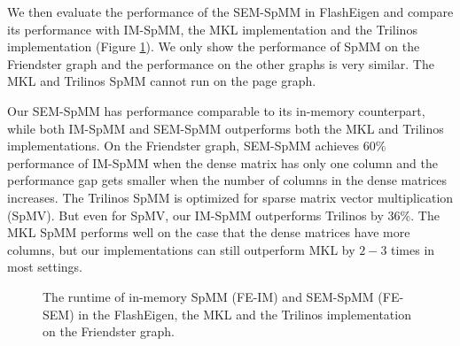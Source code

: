 We then evaluate the performance of the SEM-SpMM in FlashEigen and compare its
performance with IM-SpMM, the MKL implementation and the Trilinos
implementation (Figure \ref{perf:spmm}). We only show the performance of
SpMM on the Friendster graph and the performance on the other graphs is very
similar. The MKL and Trilinos SpMM cannot run on the page graph.

Our SEM-SpMM has performance comparable to its in-memory counterpart, while
both IM-SpMM and SEM-SpMM outperforms both the MKL and Trilinos
implementations. On the Friendster graph, SEM-SpMM achieves 60\% performance
of IM-SpMM when the dense matrix has only one column and the performance gap
gets smaller when the number of columns in the dense matrices increases.
The Trilinos SpMM is optimized for sparse matrix vector multiplication (SpMV).
But even for SpMV, our IM-SpMM outperforms Trilinos by 36\%. The MKL SpMM
performs well on the case that the dense matrices have more columns, but our
implementations can still outperform MKL by $2-3$ times in most settings.

\begin{figure}
	\begin{center}
		\footnotesize
		\vspace{-15pt}
		
		\vspace{-15pt}
		\caption{The runtime of in-memory SpMM (FE-IM) and SEM-SpMM (FE-SEM)
			in the FlashEigen, the MKL and the Trilinos implementation on
		the Friendster graph.}
		\label{perf:spmm}
	\end{center}
\end{figure}

%		

%		
%		

